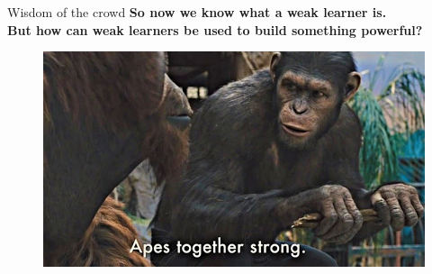 
\begin{frame}{Wisdom of the crowd} \pause
    \centering
    \textbf{So now we know what a weak learner is.}\\
    \textbf{But how can weak learners be used to build something powerful?} \pause
    \begin{figure}
        \includegraphics[height=0.6\textheight]{img/apes}
    \end{figure}
\end{frame}